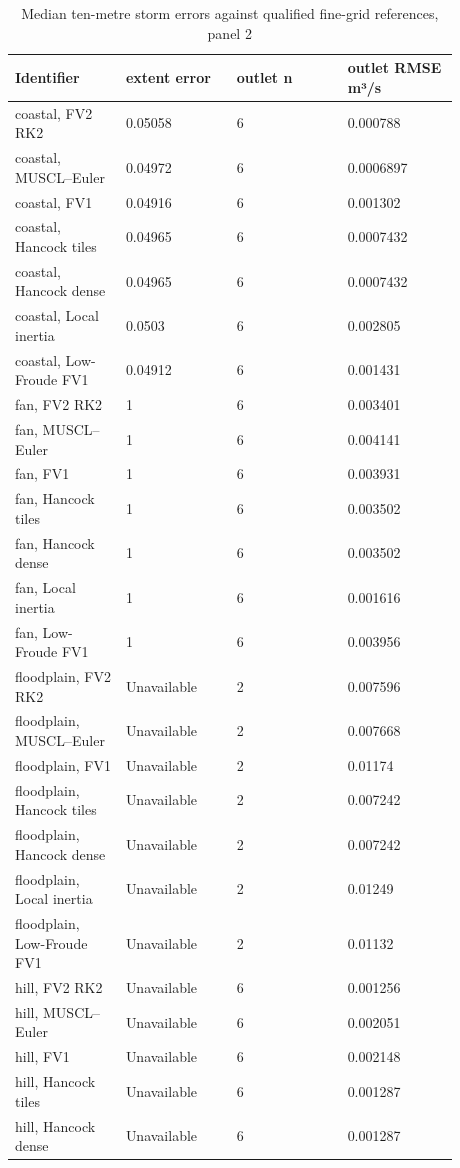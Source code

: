 \begin{longtable}{p{0.2200\linewidth}p{0.2200\linewidth}p{0.2200\linewidth}p{0.2200\linewidth}}
\caption{Median ten-metre storm errors against qualified fine-grid references, panel 2}\\
\hline
Identifier & extent error & outlet n & outlet RMSE m³/s \\
\hline\endhead
coastal, FV2 RK2 & 0.05058 & 6 & 0.000788 \\
coastal, MUSCL–Euler & 0.04972 & 6 & 0.0006897 \\
coastal, FV1 & 0.04916 & 6 & 0.001302 \\
coastal, Hancock tiles & 0.04965 & 6 & 0.0007432 \\
coastal, Hancock dense & 0.04965 & 6 & 0.0007432 \\
coastal, Local inertia & 0.0503 & 6 & 0.002805 \\
coastal, Low-Froude FV1 & 0.04912 & 6 & 0.001431 \\
fan, FV2 RK2 & 1 & 6 & 0.003401 \\
fan, MUSCL–Euler & 1 & 6 & 0.004141 \\
fan, FV1 & 1 & 6 & 0.003931 \\
fan, Hancock tiles & 1 & 6 & 0.003502 \\
fan, Hancock dense & 1 & 6 & 0.003502 \\
fan, Local inertia & 1 & 6 & 0.001616 \\
fan, Low-Froude FV1 & 1 & 6 & 0.003956 \\
floodplain, FV2 RK2 & Unavailable & 2 & 0.007596 \\
floodplain, MUSCL–Euler & Unavailable & 2 & 0.007668 \\
floodplain, FV1 & Unavailable & 2 & 0.01174 \\
floodplain, Hancock tiles & Unavailable & 2 & 0.007242 \\
floodplain, Hancock dense & Unavailable & 2 & 0.007242 \\
floodplain, Local inertia & Unavailable & 2 & 0.01249 \\
floodplain, Low-Froude FV1 & Unavailable & 2 & 0.01132 \\
hill, FV2 RK2 & Unavailable & 6 & 0.001256 \\
hill, MUSCL–Euler & Unavailable & 6 & 0.002051 \\
hill, FV1 & Unavailable & 6 & 0.002148 \\
hill, Hancock tiles & Unavailable & 6 & 0.001287 \\
hill, Hancock dense & Unavailable & 6 & 0.001287 \\

\end{longtable}
